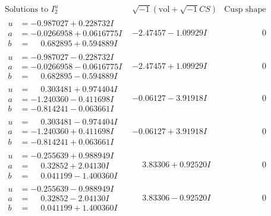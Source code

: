 \documentclass[1p]{elsarticle_modified}
\theoremstyle{definition}
\newcommand{\I}{\sqrt{-1}}
\begin{document}
$$\begin{array}{c|c|c}  
\text{Solutions to }I^u_{2}& \I (\text{vol} + \sqrt{-1}CS) & \text{Cusp shape}\\
 \hline 
\begin{aligned}
u &= -0.987027 + 0.228732 I \\
a &= -0.0266958 + 0.0616775 I \\
b &= \phantom{-}0.682895 + 0.594889 I\end{aligned}
 & -2.47457 - 1.09929 I & \phantom{-0.000000 } 0 \\ \hline\begin{aligned}
u &= -0.987027 - 0.228732 I \\
a &= -0.0266958 - 0.0616775 I \\
b &= \phantom{-}0.682895 - 0.594889 I\end{aligned}
 & -2.47457 + 1.09929 I & \phantom{-0.000000 } 0 \\ \hline\begin{aligned}
u &= \phantom{-}0.303481 + 0.974404 I \\
a &= -1.240360 - 0.411698 I \\
b &= -0.814241 - 0.063661 I\end{aligned}
 & -0.06127 - 3.91918 I & \phantom{-0.000000 } 0 \\ \hline\begin{aligned}
u &= \phantom{-}0.303481 - 0.974404 I \\
a &= -1.240360 + 0.411698 I \\
b &= -0.814241 + 0.063661 I\end{aligned}
 & -0.06127 + 3.91918 I & \phantom{-0.000000 } 0 \\ \hline\begin{aligned}
u &= -0.255639 + 0.988949 I \\
a &= \phantom{-}0.32852 + 2.04130 I \\
b &= \phantom{-}0.041199 - 1.400360 I\end{aligned}
 & \phantom{-}3.83306 + 0.92520 I & \phantom{-0.000000 } 0 \\ \hline\begin{aligned}
u &= -0.255639 - 0.988949 I \\
a &= \phantom{-}0.32852 - 2.04130 I \\
b &= \phantom{-}0.041199 + 1.400360 I\end{aligned}
 & \phantom{-}3.83306 - 0.92520 I & \phantom{-0.000000 } 0 \\ \hline\begin{aligned}

\end{aligned}
\end{array}$$
\end{document}
